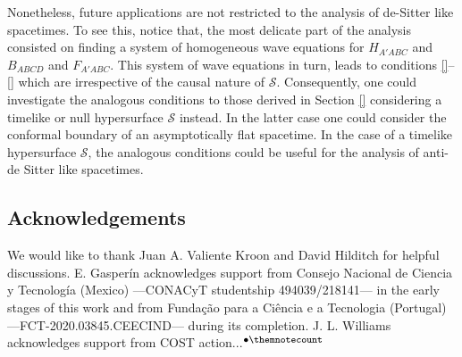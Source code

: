 \documentclass[10pt,a4paper]{article}
\theoremstyle{plain}
\newcounter{mnotecount}%
\newcommand{\mnotex}[1]%
{\protect{\stepcounter{mnotecount}}$^{\mbox{\footnotesize $\bullet$\themnotecount}}$ 
\marginpar{%
\raggedright\tiny\em
$\!\!\!\!\!\!\,\bullet$\themnotecount: #1} }
\begin{document}
Nonetheless, future applications are not
restricted to the analysis of de-Sitter like spacetimes. To see this,
notice that, the most delicate part of the analysis consisted on
finding a system of homogeneous wave equations for $H_{A'ABC}$ and
$B_{ABCD}$ and $F_{A'ABC}$. This system of wave equations in turn, leads to
conditions \eqref{}--\eqref{}
which are irrespective of the causal nature of
$\mathcal{S}$. Consequently, one could investigate the analogous
conditions to those derived in Section \ref{}
considering a timelike or null hypersurface $\mathcal{S}$ instead. In
the latter case one could consider the conformal boundary of an
asymptotically flat spacetime. In the case of a timelike hypersurface
$\mathcal{S}$, the analogous conditions could be useful for the
 analysis of anti-de Sitter like spacetimes.


\subsection*{Acknowledgements}

We would like to thank Juan A. Valiente Kroon and David Hilditch for helpful discussions.
E. Gasper\'in acknowledges support from Consejo Nacional de
Ciencia y Tecnolog\'ia (Mexico) ---CONACyT studentship
494039/218141--- in the early stages of this work and from Fundaç\~ao
para a Ci\^encia e a Tecnologia (Portugal) ---FCT-2020.03845.CEECIND---
during its completion. J. L. Williams acknowledges support from COST action...\mnotex{Code needed...} 

% 


%




\end{document}
